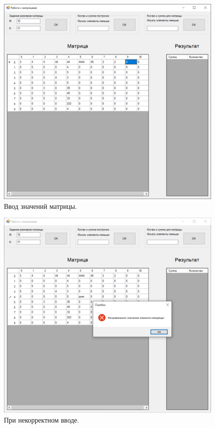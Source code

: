 \documentclass[a4paper,12pt]{article}
\theoremstyle{plain}
\theoremstyle{remark}
\theoremstyle{definition}
\begin{document}
	\begin{figure}[h!]
		\centering
		\includegraphics[width=.9\linewidth]{2.png}
		\caption{Ввод значений матрицы.}
	\end{figure}
	
	\begin{figure}[h!]
		\centering
		\includegraphics[width=.9\linewidth]{3.png}
		\caption{При некорректном вводе.}
	\end{figure}
	
\end{document}
